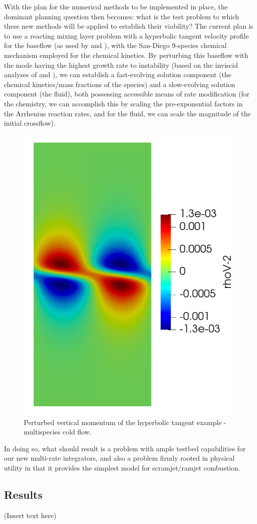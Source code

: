 With the plan for the numerical methods to be implemented in place, the dominant
planning question then becomes: what is the test problem to which these new methods will
be applied to establish their viability? The current plan is to use a reacting mixing layer
problem with a hyperbolic tangent velocity profile for the baseflow (as used by \cite{michalke1964inviscid}
and \cite{blumen1970shear}), with the San-Diego 9-species chemical mechanism employed for
the chemical kinetics. By perturbing this baseflow with the mode having the highest growth
rate to instability (based on the inviscid analyses of \cite{michalke1964inviscid} and
\cite{blumen1970shear}), we can establish a fast-evolving solution component (the chemical
kinetics/mass fractions of the species) and a slow-evolving solution component (the fluid),
both possessing accessible means of rate modification (for the chemistry, we can accomplish
this by scaling the pre-exponential factors in the Arrhenius reaction rates, and for the
fluid, we can scale the magnitude of the initial crossflow).

\begin{figure}
\centering
\includegraphics[width=0.3\linewidth,trim=4 4 4 4,clip]{figures/hyperbolic_tangent.png}
\caption{Perturbed vertical momentum of the hyperbolic tangent example - multispecies cold flow.}
\label{fig:hyperbolic_cold_rhov2}
\end{figure}

In doing so, what should result is a problem with ample testbed capabilities for our
new multi-rate integrators, and also a problem firmly rooted in physical utility in that
it provides the simplest model for scramjet/ramjet combustion.

\subsection{Results}
(Insert text here)

